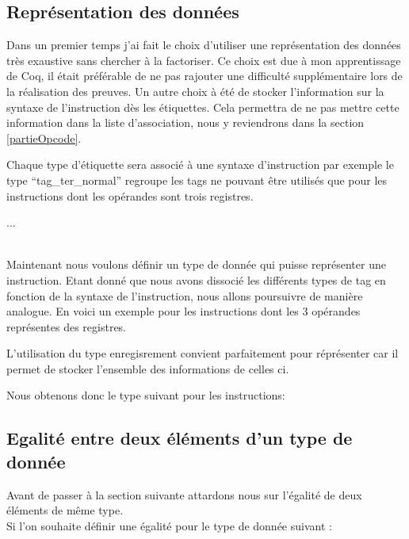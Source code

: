 \documentclass {article}
\newcommand{\codefrom}[3]
           {}
\theoremstyle{definition}
\theoremstyle{remark}
\begin{document}
\subsection{Représentation des données}
\label{representation des donnees}

Dans un premier temps j'ai fait le choix d'utiliser une représentation des données très exaustive sans
chercher à la factoriser. Ce choix est due à mon apprentissage de Coq, il était préférable de ne pas
rajouter une difficulté supplémentaire lors de la réalisation des preuves.
Un autre choix à été de stocker l'information sur la syntaxe de l'instruction dès les étiquettes.
Cela permettra de ne pas mettre cette information dans la liste d'association, nous y reviendrons dans la
section \ref{partieOpcode}.

\codefrom{src}{ast_instructions}{tag}

Chaque type d'étiquette sera associé à une syntaxe d'instruction par exemple le type ``tag\_ter\_normal''
regroupe les tags ne pouvant être utilisés que pour les instructions dont les opérandes sont trois registres.

\codefrom{src}{ast_instructions}{tag_definition}
...

\\ 

Maintenant nous voulons définir un type de donnée qui puisse représenter une instruction.
Etant donné que nous avons dissocié les différents types de tag en fonction de la syntaxe de l'instruction,
nous allons poursuivre de manière analogue.
En voici un exemple pour les instructions dont les 3 opérandes représentes des registres.

\codefrom{src}{ast_instructions}{instruction_tern_n}

L'utilisation du type enregisrement convient parfaitement pour réprésenter car il permet de stocker
l'ensemble des informations de celles ci.

Nous obtenons donc le type suivant pour les instructions:
\codefrom{src}{ast_instructions}{instruction}




\subsection{Egalité entre deux éléments d'un type de donnée}
Avant de passer à la section suivante attardons nous sur l'égalité de deux éléments de même type.
\\
Si l'on souhaite définir une égalité pour le type de donnée suivant :
\codefrom{rapport}{definitions}{example_type}
\end{document}

